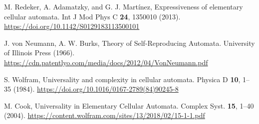 \begin{thebibliography}{04}
\raggedright
M. Redeker, A. Adamatzky, and G. J. Martínez,
Expressiveness of elementary cellular automata.
Int J Mod Phys C \textbf{24}, 1350010 (2013).
\url{https://doi.org/10.1142/S0129183113500101}

\raggedright
J. von Neumann, A. W. Burks, 
Theory of Self-Reproducing Automata. 
University of Illinois Press (1966).
\url{https://cdn.patentlyo.com/media/docs/2012/04/VonNeumann.pdf}

\raggedright
S. Wolfram,
Universality and complexity in cellular automata.
Physica D \textbf{10}, 1--35 (1984).
\url{https://doi.org/10.1016/0167-2789(84)90245-8}

\raggedright
M. Cook,
Universality in Elementary Cellular Automata.
Complex Syst. \textbf{15}, 1--40 (2004). 
\url{https://content.wolfram.com/sites/13/2018/02/15-1-1.pdf}
\end{thebibliography}


